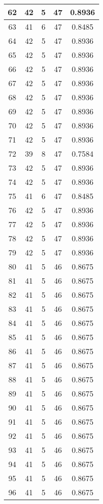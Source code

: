 \documentclass[letterpaper, 12pt]{article}
\begin{document}
\begin{longtable}{|c|c|c|c|c|}
\hline
62 & 42 & 5 & 47 & 0.8936 \\
\hline
63 & 41 & 6 & 47 & 0.8485 \\
\hline
64 & 42 & 5 & 47 & 0.8936 \\
\hline
65 & 42 & 5 & 47 & 0.8936 \\
\hline
66 & 42 & 5 & 47 & 0.8936 \\
\hline
67 & 42 & 5 & 47 & 0.8936 \\
\hline
68 & 42 & 5 & 47 & 0.8936 \\
\hline
69 & 42 & 5 & 47 & 0.8936 \\
\hline
70 & 42 & 5 & 47 & 0.8936 \\
\hline
71 & 42 & 5 & 47 & 0.8936 \\
\hline
72 & 39 & 8 & 47 & 0.7584 \\
\hline
73 & 42 & 5 & 47 & 0.8936 \\
\hline
74 & 42 & 5 & 47 & 0.8936 \\
\hline
75 & 41 & 6 & 47 & 0.8485 \\
\hline
76 & 42 & 5 & 47 & 0.8936 \\
\hline
77 & 42 & 5 & 47 & 0.8936 \\
\hline
78 & 42 & 5 & 47 & 0.8936 \\
\hline
79 & 42 & 5 & 47 & 0.8936 \\
\hline
80 & 41 & 5 & 46 & 0.8675 \\
\hline
81 & 41 & 5 & 46 & 0.8675 \\
\hline
82 & 41 & 5 & 46 & 0.8675 \\
\hline
83 & 41 & 5 & 46 & 0.8675 \\
\hline
84 & 41 & 5 & 46 & 0.8675 \\
\hline
85 & 41 & 5 & 46 & 0.8675 \\
\hline
86 & 41 & 5 & 46 & 0.8675 \\
\hline
87 & 41 & 5 & 46 & 0.8675 \\
\hline
88 & 41 & 5 & 46 & 0.8675 \\
\hline
89 & 41 & 5 & 46 & 0.8675 \\
\hline
90 & 41 & 5 & 46 & 0.8675 \\
\hline
91 & 41 & 5 & 46 & 0.8675 \\
\hline
92 & 41 & 5 & 46 & 0.8675 \\
\hline
93 & 41 & 5 & 46 & 0.8675 \\
\hline
94 & 41 & 5 & 46 & 0.8675 \\
\hline
95 & 41 & 5 & 46 & 0.8675 \\
\hline
96 & 41 & 5 & 46 & 0.8675 \\

\end{longtable}
\end{document}

